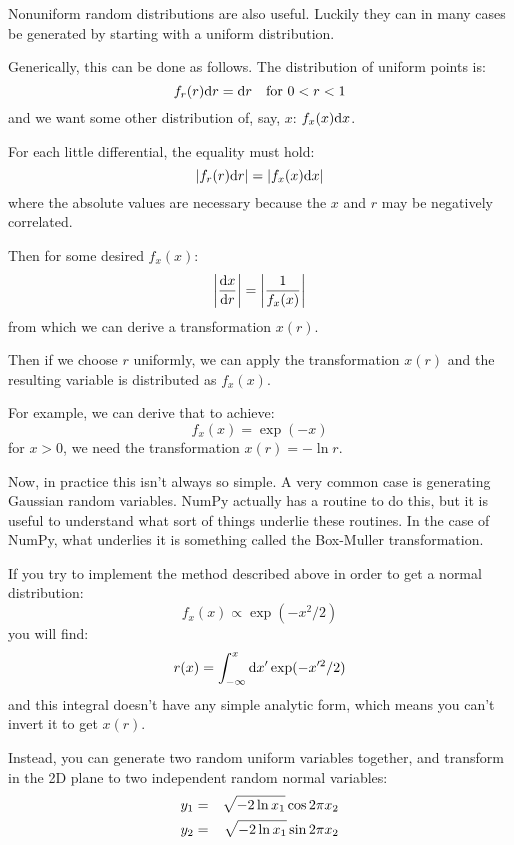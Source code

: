 Nonuniform random distributions are also useful. Luckily they can in
many cases be generated by starting with a uniform distribution. 

Generically, this can be done as follows. The distribution of uniform
points is:
\begin{equation}
f_r(r) {\rm d}r = {\rm d}r \quad \mathrm{for~} 0 < r < 1
\end{equation}
and we want some other distribution of, say, $x$: $f_x(x) {\rm d}x$.

For each little differential, the equality must hold:
\begin{equation}
\left| f_r(r) {\rm d}r \right| = \left|f_x(x) {\rm d}x \right|
\end{equation}
where the absolute values are necessary because the $x$ and $r$ may be
negatively correlated.

Then for some desired $f_x(x)$:
\begin{equation}
\left| \frac{{\rm d}x}{{\rm d}r} \right| = \left|\frac{1}{f_x(x)}\right|
\end{equation}
from which we can derive a transformation $x(r)$.

Then if we choose $r$ uniformly, we can apply the transformation
$x(r)$ and the resulting variable is distributed as $f_x(x)$.

For example, we can derive that to achieve:
\begin{equation}
f_x(x) = \exp(-x)
\end{equation}
for $x>0$, we need the transformation $x(r) = -\ln r$.

Now, in practice this isn't always so simple. A very common case is
generating Gaussian random variables. NumPy actually has a routine to
do this, but it is useful to understand what sort of things underlie
these routines. In the case of NumPy, what underlies it is something
called the Box-Muller transformation.

If you try to implement the method described above in order to get a
normal distribution:
\begin{equation}
f_x(x) \propto \exp\left(-x^2/2\right)
\end{equation}
you will find:
\begin{equation}
r(x) = \int_{-\infty}^{x} {\rm d}x' \exp(-x'^2/2)
\end{equation}
and this integral doesn't have any simple analytic form, which means
you can't invert it to get $x(r)$. 

Instead, you can generate two random uniform variables together, and
transform in the 2D plane to two independent random normal
variables:
\begin{eqnarray}
y_1 &=& \sqrt{-2 \ln x_1} \cos 2\pi x_2 \cr
y_2 &=& \sqrt{-2 \ln x_1} \sin 2\pi x_2
\end{eqnarray}

